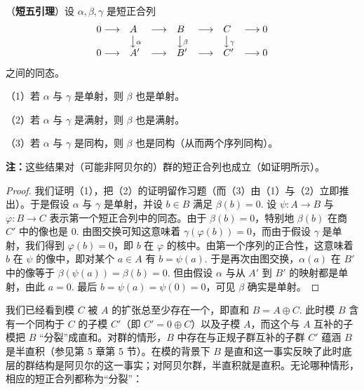 \begin{proposition}\label{pro:10.24}
（\textbf{短五引理}）设 \(\alpha, \beta, \gamma\) 是短正合列
\[
\begin{array}{lllllll}
0 \longrightarrow & A & \longrightarrow & B & \longrightarrow & C & \longrightarrow 0\\
& \big\downarrow{\scriptstyle\alpha} & & \big\downarrow{\scriptstyle\beta} & & \big\downarrow{\scriptstyle\gamma} & \\
0 \longrightarrow & A' & \longrightarrow & B' & \longrightarrow & C' & \longrightarrow 0
\end{array}
\]
之间的同态。

（1）若 \(\alpha\) 与 \(\gamma\) 是单射，则 \(\beta\) 也是单射。

（2）若 \(\alpha\) 与 \(\gamma\) 是满射，则 \(\beta\) 也是满射。

（3）若 \(\alpha\) 与 \(\gamma\) 是同构，则 \(\beta\) 也是同构（从而两个序列同构）。
\end{proposition}

\noindent\textbf{注：}这些结果对（可能非阿贝尔的）群的短正合列也成立（如证明所示）。

\begin{proof}
我们证明（1），把（2）的证明留作习题（而（3）由（1）与（2）立即推出）。于是假设 \(\alpha\) 与 \(\gamma\) 是单射，并设 \(b \in B\) 满足 \(\beta(b) = 0\). 设 \(\psi : A \to B\) 与 \(\varphi : B \to C\) 表示第一个短正合列中的同态。由于 \(\beta(b) = 0\)，特别地 \(\beta(b)\) 在商 \(C'\) 中的像也是 0. 由图交换可知这意味着 \(\gamma(\varphi(b)) = 0\)，而由于假设 \(\gamma\) 是单射，我们得到 \(\varphi(b) = 0\)，即 \(b\) 在 \(\varphi\) 的核中。由第一个序列的正合性，这意味着 \(b\) 在 \(\psi\) 的像中，即对某个 \(a \in A\) 有 \(b = \psi(a)\). 于是再次由图交换，\(\alpha(a)\) 在 \(B'\) 中的像等于 \(\beta(\psi(a)) = \beta(b) = 0\). 但由假设 \(\alpha\) 与从 \(A'\) 到 \(B'\) 的映射都是单射，由此 \(a = 0\). 最后 \(b = \psi(a) = \psi(0) = 0\)，可见 \(\beta\) 确实是单射。
\end{proof}

我们已经看到模 \(C\) 被 \(A\) 的扩张总至少存在一个，即直和 \(B = A \oplus C\). 此时模 \(B\) 含有一个同构于 \(C\) 的子模 \(C'\)（即 \(C' = 0 \oplus C\)）以及子模 \(A\)，而这个与 \(A\) 互补的子模把 \(B\) “分裂”成直和。对群的情形，\(B\) 中存在与正规子群互补的子群 \(C'\) 蕴涵 \(B\) 是半直积（参见第 5 章第 5 节）。在模的背景下 \(B\) 是直和这一事实反映了此时底层的群结构是阿贝尔的这一事实；对阿贝尔群，半直积就是直积。无论哪种情形，相应的短正合列都称为“分裂”：

